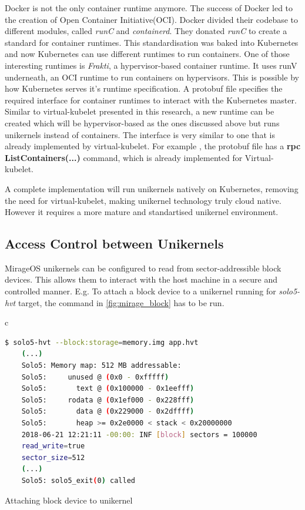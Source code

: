 Docker is not the only container runtime anymore. The success of Docker led to the creation of Open Container Initiative(OCI). Docker divided their codebase to different modules, called \textit{runC} and \textit{containerd}. They donated \textit{runC} to create a standard for container runtimes. This standardisation was baked into Kubernetes and now Kubernetes can use different runtimes to run containers. One of those interesting runtimes is \textit{Frakti}, a hypervisor-based container runtime. It uses runV underneath, an OCI runtime to run containers on hypervisors. This is possible by how Kubernetes serves it's runtime specification. A protobuf file \cite{protobuf} specifies the required interface for container runtimes to interact with the Kubernetes master. Similar to virtual-kubelet presented in this research, a new runtime can be created which will be hypervisor-based as the ones discussed above but runs unikernels instead of containers. The interface is very similar to one that is already implemented by virtual-kubelet. For example , the protobuf file has a \textbf{rpc ListContainers(...)} command, which is already implemented for Virtual-kubelet.

A complete implementation will run unikernels natively on Kubernetes, removing the need for virtual-kubelet, making unikernel technology truly cloud native. However it requires a more mature and standartised unikernel environment.

\subsection{Access Control between Unikernels}

MirageOS unikernels can be configured to read from sector-addressible block devices. This allows them to interact with the host machine in a secure and controlled manner. E.g. To attach a block device to a unikernel running for \textit{solo5-hvt} target,  the command in \ref{fig:mirage_block} has to be run.

\begin{code}[htpb]
  \centering
  \begin{tabular}{c}
  \begin{lstlisting}[language=bash]
    $ solo5-hvt --block:storage=memory.img app.hvt
    (...)
    Solo5: Memory map: 512 MB addressable:
    Solo5:     unused @ (0x0 - 0xfffff)
    Solo5:       text @ (0x100000 - 0x1eefff)
    Solo5:     rodata @ (0x1ef000 - 0x228fff)
    Solo5:       data @ (0x229000 - 0x2dffff)
    Solo5:       heap >= 0x2e0000 < stack < 0x20000000
    2018-06-21 12:21:11 -00:00: INF [block] sectors = 100000
    read_write=true
    sector_size=512
    (...)
    Solo5: solo5_exit(0) called
\end{lstlisting}
\end{tabular}
\caption{Attaching block device to unikernel}\label{fig:mirage_block}
\end{code}

